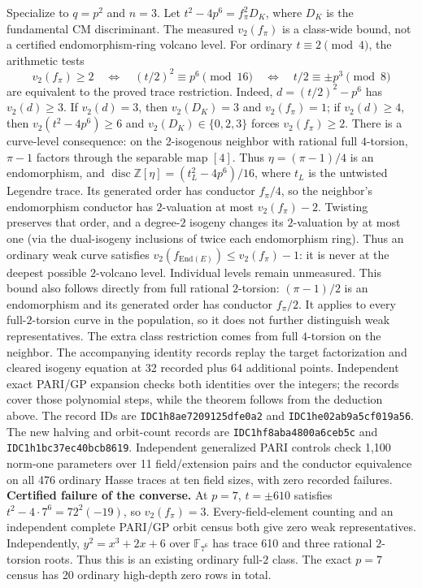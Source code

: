 \documentclass[10pt]{extarticle}
\begin{document}
\noindent Specialize to $q=p^2$ and $n=3$. Let
$t^2-4p^6=f_\pi^2D_K$, where $D_K$ is the fundamental CM
discriminant. The measured $v_2(f_\pi)$ is a class-wide bound, not
a certified endomorphism-ring volcano level. For ordinary
$t\equiv2\pmod4$, the arithmetic tests
\[
 v_2(f_\pi)\geq2\quad\Longleftrightarrow\quad
 (t/2)^2\equiv p^6\pmod{16}\quad\Longleftrightarrow\quad
 t/2\equiv\pm p^3\pmod8
\]
are equivalent to the proved trace restriction. Indeed,
$d=(t/2)^2-p^6$ has $v_2(d)\geq3$. If $v_2(d)=3$, then
$v_2(D_K)=3$ and $v_2(f_\pi)=1$; if $v_2(d)\geq4$, then
$v_2(t^2-4p^6)\geq6$ and $v_2(D_K)\in\{0,2,3\}$ forces
$v_2(f_\pi)\geq2$.
There is a curve-level consequence: on the 2-isogenous neighbor with
rational full $4$-torsion, $\pi-1$ factors through the separable map $[4]$.
Thus $\eta=(\pi-1)/4$ is an endomorphism, and
$\operatorname{disc}\mathbb Z[\eta]=(t_L^2-4p^6)/16$, where $t_L$ is
the untwisted Legendre trace. Its generated order has conductor $f_\pi/4$,
so the neighbor's endomorphism conductor has $2$-valuation at most $v_2(f_\pi)-2$.
Twisting preserves that order, and a degree-$2$ isogeny changes its
$2$-valuation by at most one (via the dual-isogeny inclusions of twice
each endomorphism ring). Thus an ordinary weak curve satisfies
$v_2(f_{\mathrm{End}(E)})\leq v_2(f_\pi)-1$: it is never at the deepest
possible $2$-volcano level. Individual levels remain unmeasured.
This bound also follows directly from full rational $2$-torsion:
$(\pi-1)/2$ is an endomorphism and its generated order has conductor
$f_\pi/2$. It applies to every full-$2$-torsion curve in the population,
so it does not further distinguish weak representatives. The extra class
restriction comes from full $4$-torsion on the neighbor.
The accompanying identity records replay the target factorization and
cleared isogeny equation at 32 recorded plus 64 additional points.
Independent exact PARI/GP expansion checks both identities over the integers;
the records cover those polynomial steps, while the theorem follows from
the deduction above.
The record IDs are \texttt{IDC1h8ae7209125dfe0a2} and
\texttt{IDC1he02ab9a5cf019a56}.
The new halving and orbit-count records are
\texttt{IDC1hf8aba4800a6ceb5c} and \texttt{IDC1h1bc37ec40bcb8619}.
Independent generalized PARI controls check 1,100 norm-one parameters
over 11 field/extension pairs and the conductor equivalence on all 476
ordinary Hasse traces at ten field sizes, with zero recorded failures.
\newpage
\noindent\textbf{Certified failure of the converse.} At $p=7$,
$t=\pm610$ satisfies
$t^2-4\cdot7^6=72^2(-19)$, so $v_2(f_\pi)=3$.
Every-field-element counting and an independent complete PARI/GP orbit
census both give zero weak representatives. Independently,
$y^2=x^3+2x+6$ over $\mathbb F_{7^6}$ has trace 610 and three rational
$2$-torsion roots. Thus this is an existing ordinary full-$2$ class.
The exact $p=7$ census has 20 ordinary high-depth zero rows in total.
\end{document}
